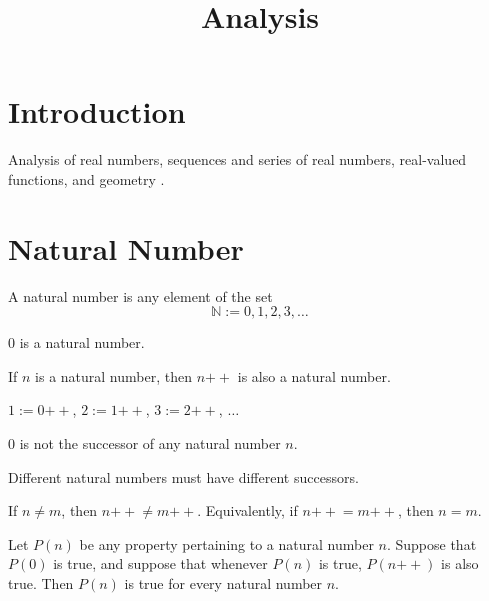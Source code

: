 \documentclass{blog}
\title{Analysis}
\begin{document}
\maketitle
\tableofcontents

\section{Introduction}
\begin{definition}[analysis]
  Analysis of real numbers, sequences and series of real numbers, real-valued functions, and geometry
  \cite{TAO_2022_ANALYSIS_1, TAO_2022_ANALYSIS_2}.
\end{definition}

\section{Natural Number}
\begin{definition}
  A natural number is any element of the set
  \begin{equation}
    \mathbb{N} := {0, 1, 2, 3, \dots}
  \end{equation}
\end{definition}

\begin{axiom}[0]
  0 is a natural number.
\end{axiom}

\begin{axiom}[successor]
  If $n$ is a natural number, then $n{++}$ is also a natural number.
\end{axiom}

\begin{definition}[notation]
  $1 := 0{++}$, $2 := 1{++}$, $3 := 2{++}$, $\dots$
\end{definition}

\begin{axiom}[$n{++} \neq 0$]
  0 is not the successor of any natural number $n$.
\end{axiom}

\begin{axiom}[$n{++} \neq m{++}$]
  Different natural numbers must have different successors.

  If $n \neq m$, then $n{++} \neq m{++}$.
  Equivalently, if $n{++} = m{++}$, then $n = m$.
\end{axiom}

\begin{axiom}
  Let $P(n)$ be any property pertaining to a natural number $n$.
  Suppose that $P(0)$ is true, and suppose that whenever $P(n)$ is true,
  $P(n{++})$ is also true. Then $P(n)$ is true for every natural number $n$.
\end{axiom}
\end{document}
